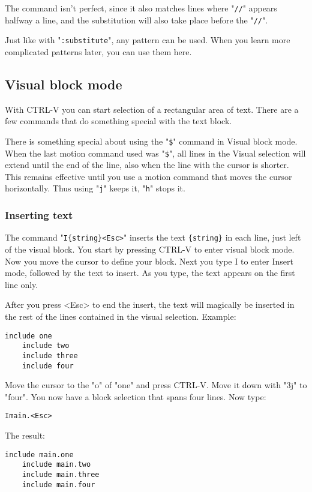 The command isn't perfect, since it also matches lines where "\texttt{//}" appears halfway a line, and the substitution will also take place before the "\texttt{//}".

Just like with "\texttt{:substitute}", any pattern can be used.
When you learn more complicated patterns later, you can use them here.
\subsection{Visual block mode}
With CTRL-V you can start selection of a rectangular area of text.
There are a few commands that do something special with the text block.

There is something special about using the "\texttt{\$}" command in Visual block mode.
When the last motion command used was "\texttt{\$}", all lines in the Visual selection will extend until the end of the line, also when the line with the cursor is shorter.
This remains effective until you use a motion command that moves the cursor horizontally.
Thus using "\texttt{j}" keeps it, "\texttt{h}" stops it.

\subsubsection{Inserting text}
The command  "\texttt{I\{string\}<Esc>}" inserts the text \texttt{\{string\}} in each line, just left of the visual block.
You start by pressing CTRL-V to enter visual block mode.
Now you move the cursor to define your block.
Next you type I to enter Insert mode, followed by the text to insert.
As you type, the text appears on the first line only.

After you press <Esc> to end the insert, the text will magically be inserted in the rest of the lines contained in the visual selection.
Example:

\begin{Verbatim}[samepage=true]
    include one 
    include two 
    include three 
    include four 
\end{Verbatim}

Move the cursor to the "o" of "one" and press CTRL-V.
Move it down with "3j" to "four".
You now have a block selection that spans four lines.
Now type:

\begin{Verbatim}[samepage=true]
 Imain.<Esc>
\end{Verbatim}

The result:

\begin{Verbatim}[samepage=true]
    include main.one 
    include main.two 
    include main.three 
    include main.four 
\end{Verbatim}


